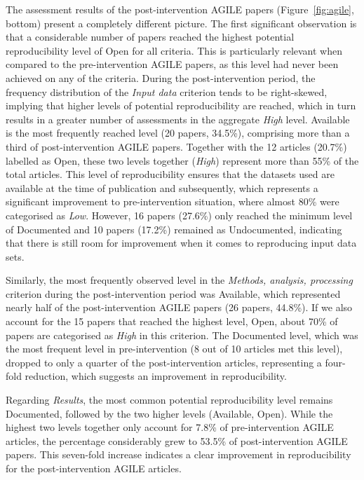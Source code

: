\documentclass{josis}
\begin{document}
The assessment results of the post-intervention AGILE papers (Figure~\ref{fig:agile}, bottom) present a completely different picture. 
The first significant observation is that a considerable number of papers reached the highest potential reproducibility level of Open for all criteria. 
This is particularly relevant when compared to the pre-intervention AGILE papers, as this level had never been achieved on any of the criteria.
During the post-intervention period, the frequency distribution of the \textit{Input data} criterion tends to be right-skewed, implying that higher levels of potential reproducibility are reached, 
which in turn results in a greater number of assessments in the aggregate \textit{High} level.
Available is the most frequently reached level (20 papers, 34.5\%), comprising more than a third of post-intervention AGILE papers. 
Together with the 12 articles (20.7\%) labelled as Open, these two levels together (\textit{High}) represent more than 55\% of the total articles. 
This level of reproducibility ensures that the datasets used are available at the time of publication and subsequently, which represents a significant improvement to pre-intervention situation, where almost 80\% were categorised as \textit{Low}. 
However, 16 papers (27.6\%) only reached the minimum level of Documented and 10 papers (17.2\%) remained as Undocumented, indicating that there is still room for improvement when it comes to reproducing input data sets.

Similarly, the most frequently observed level in the \textit{Methods, analysis, processing} criterion during the post-intervention period was Available, which represented nearly half of the post-intervention AGILE papers (26 papers, 44.8\%). 
If we also account for the 15 papers that reached the highest level, Open, about 70\% of papers are categorised as \textit{High} in this criterion. 
The Documented level, which was the most frequent level in pre-intervention (8 out of 10 articles met this level), dropped to only a quarter of the post-intervention articles, representing a four-fold reduction, which suggests an improvement in reproducibility.

Regarding \textit{Results}, the most common potential reproducibility level remains Documented, followed by the two higher levels (Available, Open). 
While the highest two levels together only account for 7.8\% of pre-intervention AGILE articles, the percentage considerably grew to 53.5\% of post-intervention AGILE papers. 
This seven-fold increase indicates a clear improvement in reproducibility for the post-intervention AGILE articles.
\end{document}
